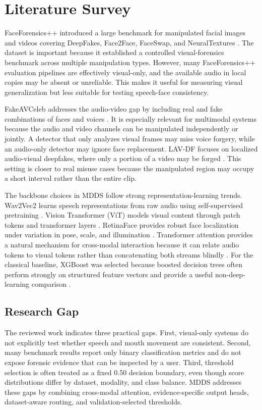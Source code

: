 \documentclass[conference]{IEEEtran}
\begin{document}
\section{Literature Survey}
FaceForensics++ introduced a large benchmark for manipulated facial images and videos covering DeepFakes, Face2Face, FaceSwap, and NeuralTextures \cite{rossler2019faceforensics}. The dataset is important because it established a controlled visual-forensics benchmark across multiple manipulation types. However, many FaceForensics++ evaluation pipelines are effectively visual-only, and the available audio in local copies may be absent or unreliable. This makes it useful for measuring visual generalization but less suitable for testing speech-face consistency.

FakeAVCeleb addresses the audio-video gap by including real and fake combinations of faces and voices \cite{khalid2021fakeavceleb}. It is especially relevant for multimodal systems because the audio and video channels can be manipulated independently or jointly. A detector that only analyzes visual frames may miss voice forgery, while an audio-only detector may ignore face replacement. LAV-DF focuses on localized audio-visual deepfakes, where only a portion of a video may be forged \cite{cai2022lavdf}. This setting is closer to real misuse cases because the manipulated region may occupy a short interval rather than the entire clip.

The backbone choices in MDDS follow strong representation-learning trends. Wav2Vec2 learns speech representations from raw audio using self-supervised pretraining \cite{baevski2020wav2vec}. Vision Transformer (ViT) models visual content through patch tokens and transformer layers \cite{dosovitskiy2021vit}. RetinaFace provides robust face localization under variation in pose, scale, and illumination \cite{deng2020retinaface}. Transformer attention provides a natural mechanism for cross-modal interaction because it can relate audio tokens to visual tokens rather than concatenating both streams blindly \cite{vaswani2017attention}. For the classical baseline, XGBoost was selected because boosted decision trees often perform strongly on structured feature vectors and provide a useful non-deep-learning comparison \cite{chen2016xgboost}.

\subsection{Research Gap}
The reviewed work indicates three practical gaps. First, visual-only systems do not explicitly test whether speech and mouth movement are consistent. Second, many benchmark results report only binary classification metrics and do not expose forensic evidence that can be inspected by a user. Third, threshold selection is often treated as a fixed 0.50 decision boundary, even though score distributions differ by dataset, modality, and class balance. MDDS addresses these gaps by combining cross-modal attention, evidence-specific output heads, dataset-aware routing, and validation-selected thresholds.
\end{document}
